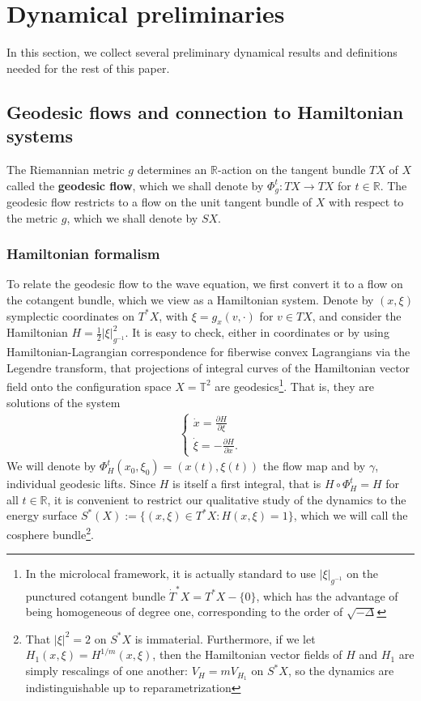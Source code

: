 \documentclass[11pt,letterpaper,oneside]{amsart}
\newcommand{\R}{\mathbb{R}}
\newcommand{\T}{\mathbb{T}}
\theoremstyle{definition}
\theoremstyle{remark}
\renewcommand{\d}{\partial}
\theoremstyle{definition}
\theoremstyle{remark}
\begin{document}
\section{Dynamical preliminaries} \label{sec:dynamics}

In this section, we collect several preliminary dynamical results and definitions needed for the rest of this paper.

\subsection{Geodesic flows and connection to Hamiltonian systems}\label{sec:geod-hamilton}

The Riemannian metric $g$ determines an $\R$-action on the tangent bundle $T X$ of $X$ called the \textbf{geodesic flow}, which we shall denote by $\Phi^t_g: TX \to TX$ for $t \in \R$.
The geodesic flow restricts to a flow on the unit tangent bundle of $X$ with respect to the metric $g$, which we shall denote by $SX$.

\subsubsection{Hamiltonian formalism} \label{subsubsec:Hamiltonian} 

To relate the geodesic flow to the wave equation, we first convert it to a flow on the cotangent bundle, which we view as a Hamiltonian system. Denote by $(x, \xi)$ symplectic coordinates on $T^*X$, with $\xi = g_x(v,\cdot)$ for $v \in TX$, and consider the Hamiltonian $H = \frac{1}{2} |\xi|_{g^{-1}}^2$. It is easy to check, either in coordinates or by using Hamiltonian-Lagrangian correspondence for fiberwise convex Lagrangians via the Legendre transform, that projections of integral curves of the Hamiltonian vector field onto the configuration space $X = \T^2$ are geodesics\footnote{In the microlocal framework, it is actually standard to use $|\xi|_{g^{-1}}$ on the punctured cotangent bundle $\dot{T}^*X =T^* X - \{0\}$, which has the advantage of being homogeneous of degree one, corresponding to the order of $\sqrt{-\Delta}$}. That is, they are solutions of the system 
\begin{align*}
    \begin{cases}
        \dot{x} =  \frac{\d H}{\d \xi}\\
        \dot{\xi} = - \frac{\d H}{\d x}.
    \end{cases}
\end{align*}
We will denote by $\Phi_H^t(x_0,\xi_0) = (x(t), \xi(t))$ the flow map and by $\gamma$, individual geodesic lifts. Since $H$ is itself a first integral, that is $ H \circ \Phi_H^t = H$ for all $t \in \R$, it is convenient to restrict our qualitative study of the dynamics to the energy surface $S^*(X):= \{(x,\xi) \in T^*X : H(x,\xi) = 1\}$, which we will call the cosphere bundle\footnote{That $|\xi|^2 = 2$ on $S^*X$ is immaterial. Furthermore, if we let $H_1(x,\xi) = H^{1/m}(x,\xi)$, then the Hamiltonian vector fields of $H$ and $H_1$ are simply rescalings of one another: $V_H = m V_{H_1}$ on $S^*X$, so the dynamics are indistinguishable up to reparametrization}.
\end{document}

